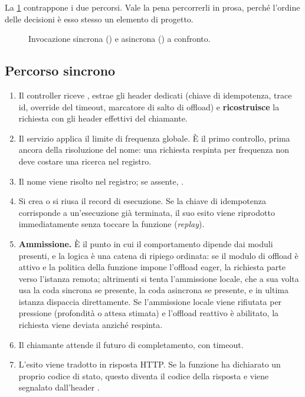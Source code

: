 La \cref{fig:flusso} contrappone i due percorsi. Vale la pena percorrerli in
prosa, perch\'e l'ordine delle decisioni \`e esso stesso un elemento di
progetto.

\begin{figure}[htbp]
  \centering
  \resizebox{0.95\textwidth}{!}{}
  \caption{Invocazione sincrona () e asincrona ()
  a confronto.}
  \label{fig:flusso}
\end{figure}

\subsection{Percorso sincrono}

\begin{enumerate}[leftmargin=*]
  \item Il controller riceve , estrae
  gli header dedicati (chiave di idempotenza, trace id, override del timeout,
  marcatore di salto di offload) e \textbf{ricostruisce} la richiesta con gli
  header effettivi del chiamante.

  \item Il servizio applica il limite di frequenza globale. \`E il primo
  controllo, prima ancora della risoluzione del nome: una richiesta respinta per
  frequenza non deve costare una ricerca nel registro.

  \item Il nome viene risolto nel registro; se assente, .

  \item Si crea o si riusa il record di esecuzione. Se la chiave di idempotenza
  corrisponde a un'esecuzione gi\`a terminata, il suo esito viene riprodotto
  immediatamente senza toccare la funzione (\emph{replay}).

  \item \textbf{Ammissione.} \`E il punto in cui il comportamento dipende dai
  moduli presenti, e la logica \`e una catena di ripiego ordinata: se il modulo
  di offload \`e attivo e la politica della funzione impone l'offload eager, la
  richiesta parte verso l'istanza remota; altrimenti si tenta l'ammissione
  locale, che a sua volta usa la coda sincrona se presente, la coda asincrona se
  presente, e in ultima istanza dispaccia direttamente. Se l'ammissione locale
  viene rifiutata per pressione (profondit\`a o attesa stimata) e l'offload
  reattivo \`e abilitato, la richiesta viene deviata anzich\'e respinta.

  \item Il chiamante attende il futuro di completamento, con timeout.

  \item L'esito viene tradotto in risposta HTTP. Se la funzione ha dichiarato un
  proprio codice di stato, questo diventa il codice della risposta e viene
  segnalato dall'header .
\end{enumerate}

